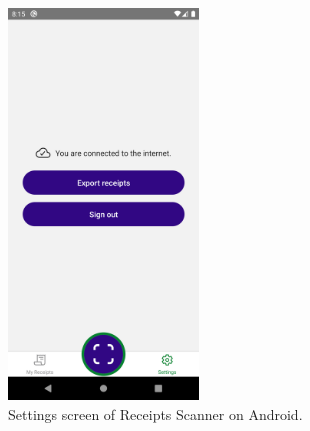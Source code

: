 \documentclass[
  printed, %
  table,   %
  oneside, %
  lof,     %
  lot,     %
]{fithesis3}
\newcommand\half{0.45}
\begin{document}
\begin{figure}[H]
    \begin{center}
        \includegraphics[width=\half\textwidth]{figures/screens/android/light/settings_screen}
    \end{center}
    \caption{Settings screen of Receipts Scanner on Android.}
    \label{fig:settings_screen}
\end{figure}
\end{document}

